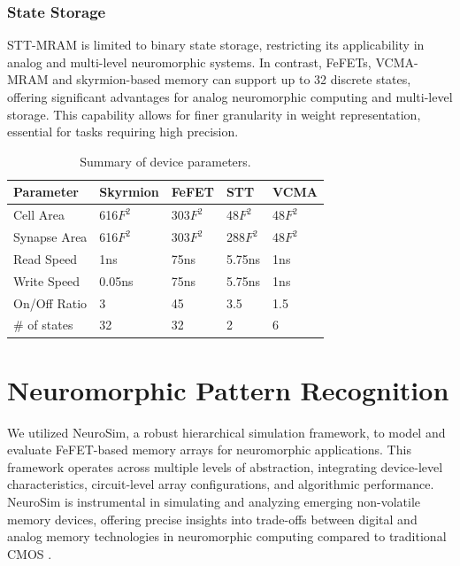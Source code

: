 \documentclass[conference]{IEEEtran}
\begin{document}
\subsubsection{State Storage}
STT-MRAM is limited to binary state storage, restricting its applicability in analog and multi-level neuromorphic systems. In contrast, FeFETs, VCMA-MRAM and skyrmion-based memory can support up to 32 discrete states, offering significant advantages for analog neuromorphic computing and multi-level storage. This capability allows for finer granularity in weight representation, essential for tasks requiring high precision.

\begin{table}[!b]
    \centering
    \normalsize
    \begin{tabular}{|l||l|l|l|l|}
    \hline
        Parameter & Skyrmion \cite{song_skyrmion-based_2020} & FeFET & STT & VCMA \\ \hline \hline
        Cell Area & 616$F^2$ & 303$F^2$ & 48$F^2$ & 48$F^2$ \\ \hline
        Synapse Area & 616$F^2$ & 303$F^2$ & 288$F^2$ & 48$F^2$ \\ \hline
        Read Speed & 1ns & 75ns & 5.75ns & 1ns \\ \hline
        Write Speed & 0.05ns & 75ns & 5.75ns & 1ns \\ \hline
        On/Off Ratio & 3 & 45 & 3.5 & 1.5 \\ \hline
        \# of states & 32 & 32 & 2 & 6 \\ \hline
    \end{tabular}
    \caption{Summary of device parameters.} 
    \label{table:device-comp}
\end{table}
\section{Neuromorphic Pattern Recognition}
We utilized NeuroSim, a robust hierarchical simulation framework, to model and evaluate FeFET-based memory arrays for neuromorphic applications. This framework operates across multiple levels of abstraction, integrating device-level characteristics, circuit-level array configurations, and algorithmic performance. NeuroSim is instrumental in simulating and analyzing emerging non-volatile memory devices, offering precise insights into trade-offs between digital and analog memory technologies in neuromorphic computing compared to traditional CMOS \cite{peng_dnnneurosim_2019}\cite{peng_dnnneurosim_2021}.
\end{document}
